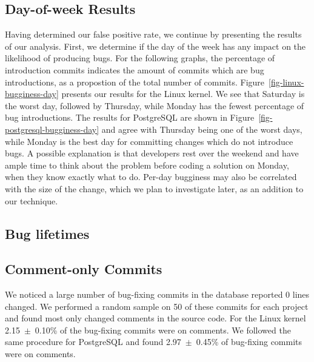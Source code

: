 \subsection{Day-of-week Results} Having determined our false positive rate, 
we continue by presenting the results of our analysis.  First, we
determine if the day of the week has any impact on the likelihood of
producing bugs. For the following graphs, the percentage of
introduction commits indicates the amount of commits which are bug
introductions, as a propostion of the total number of
commits. Figure~\ref{fig-linux-bugginess-day} presents our results for
the Linux kernel. We see that Saturday is the worst day, followed by Thursday,
while Monday has the fewest percentage of bug introductions. The
results for PostgreSQL are shown in Figure~\ref{fig-postgresql-bugginess-day} and
agree with Thursday being one of the worst days, while Monday is the
best day for committing changes which do not introduce bugs. A
possible explanation is that developers rest over the weekend and have
ample time to think about the problem before coding a solution on
Monday, when they know exactly what to do. Per-day bugginess may also
be correlated with the size of the change, which we plan to investigate
later, as an addition to our technique.

\subsection{Bug lifetimes}

\subsection{Comment-only Commits}
We noticed a large number of bug-fixing commits in the database
reported 0 lines changed. We performed a random sample on 50 of these
commits for each project and found most only changed comments in the
source code. For the Linux kernel 2.15~$\pm$~0.10\% of the bug-fixing
commits were on comments. We followed the same procedure for
PostgreSQL and found 2.97~$\pm$~0.45\% of bug-fixing commits were on
comments.


